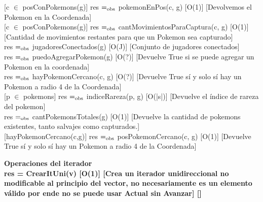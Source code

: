 [c $\in$ posConPokemons(g)]
{res $=_{\mathrm{obs}}$ pokemonEnPos(c, g)}
[O(1)]
[Devolvemos el Pokemon en la Coordenada]
\\

[c $\in$ posConPokemons(g)]
{res $=_{\mathrm{obs}}$ cantMovimientosParaCaptura(c, g)}
[O(1)]
[Cantidad de movimientos restantes para que un Pokemon sea capturado]
\\


{res $=_{\mathrm{obs}}$ jugadoresConectados(g)}
[O(J)]
[Conjunto de jugadores conectados]
\\

{res $=_{\mathrm{obs}}$ puedoAgregarPokemon(g)}
[O(?)]
[Devuelve True si se puede agregar un Pokemon en la coordenada]
\\

{res $=_{\mathrm{obs}}$ hayPokemonCercano(c, g)}
[O(?)]
[Devuelve True s\'i y solo s\'i hay un Pokemon a radio 4 de la Coordenada]
\\

[p $\in$ pokemons]
{res $=_{\mathrm{obs}}$ indiceRareza(p, g)}
[O(|s|)]
[Devuelve el índice de rareza del pokemon]
\\

{res $=_{\mathrm{obs}}$ cantPokemonsTotales(g)}
[O(1)]
[Devuelve la cantidad de pokemons existentes, tanto salvajes como capturados.]
\\

[hayPokemonCercano(c,g)]
{res $=_{\mathrm{obs}}$ posPokemonCercano(c, g)}
[O(1)]
[Devuelve True s\'i y solo s\'i hay un Pokemon a radio 4 de la Coordenada]





\bf{Operaciones del iterador}\\

{res = CrearItUni(v)}
[O(1)]
[Crea un iterador unidireccional no modificable al principio del vector, no necesariamente es un elemento válido por ende no se puede usar Actual sin Avanzar]
[]\\

